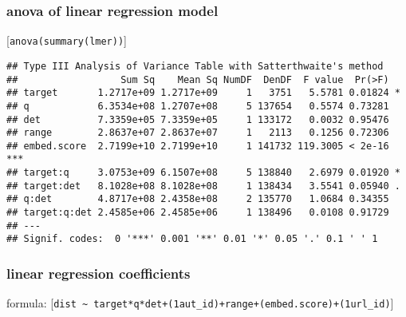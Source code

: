 \documentclass[
  12pt,
  oneside]{book}
\begin{document}
\subsubsection{anova of linear regression model}\label{anova-of-linear-regression-model-1}

{[}\texttt{anova(summary(lmer))}{]}

\begin{verbatim}
## Type III Analysis of Variance Table with Satterthwaite's method
##                  Sum Sq    Mean Sq NumDF  DenDF  F value  Pr(>F)    
## target       1.2717e+09 1.2717e+09     1   3751   5.5781 0.01824 *  
## q            6.3534e+08 1.2707e+08     5 137654   0.5574 0.73281    
## det          7.3359e+05 7.3359e+05     1 133172   0.0032 0.95476    
## range        2.8637e+07 2.8637e+07     1   2113   0.1256 0.72306    
## embed.score  2.7199e+10 2.7199e+10     1 141732 119.3005 < 2e-16 ***
## target:q     3.0753e+09 6.1507e+08     5 138840   2.6979 0.01920 *  
## target:det   8.1028e+08 8.1028e+08     1 138434   3.5541 0.05940 .  
## q:det        4.8717e+08 2.4358e+08     2 135770   1.0684 0.34355    
## target:q:det 2.4585e+06 2.4585e+06     1 138496   0.0108 0.91729    
## ---
## Signif. codes:  0 '***' 0.001 '**' 0.01 '*' 0.05 '.' 0.1 ' ' 1
\end{verbatim}

\subsubsection{linear regression coefficients}\label{linear-regression-coefficients-1}

formula: {[}\texttt{dist\ \textasciitilde{}\ target*q*det+(1\textbar{}aut\_id)+range+(embed.score)+(1\textbar{}url\_id)}{]}
\end{document}

